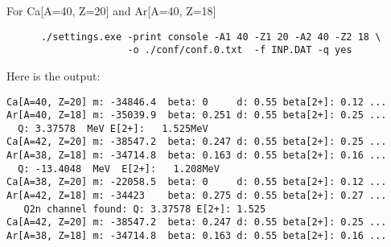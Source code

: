 \documentclass[preprint,review,12pt]{elsarticle}
\begin{document}
\begin{description}
        \subitem For Ca[A=40, Z=20] and Ar[A=40, Z=18] 
    \begin{verbatim}
      ./settings.exe -print console -A1 40 -Z1 20 -A2 40 -Z2 18 \
                     -o ./conf/conf.0.txt  -f INP.DAT -q yes
    \end{verbatim}  
Here is the output:     
\begin{verbatim}
Ca[A=40, Z=20] m: -34846.4  beta: 0     d: 0.55 beta[2+]: 0.12 ...
Ar[A=40, Z=18] m: -35039.9  beta: 0.251 d: 0.55 beta[2+]: 0.25 ...
  Q: 3.37578  MeV E[2+]:   1.525MeV
Ca[A=42, Z=20] m: -38547.2  beta: 0.247 d: 0.55 beta[2+]: 0.25 ...
Ar[A=38, Z=18] m: -34714.8  beta: 0.163 d: 0.55 beta[2+]: 0.16 ...
  Q: -13.4048  MeV  E[2+]:   1.208MeV
Ca[A=38, Z=20] m: -22058.5  beta: 0     d: 0.55 beta[2+]: 0.12 ...
Ar[A=42, Z=18] m: -34423    beta: 0.275 d: 0.55 beta[2+]: 0.27 ...
   Q2n channel found: Q: 3.37578 E[2+]: 1.525
Ca[A=42, Z=20] m: -38547.2  beta: 0.247 d: 0.55 beta[2+]: 0.25 ...
Ar[A=38, Z=18] m: -34714.8  beta: 0.163 d: 0.55 beta[2+]: 0.16 ...

    \end{verbatim}  
    \end{description}
\end{document}
